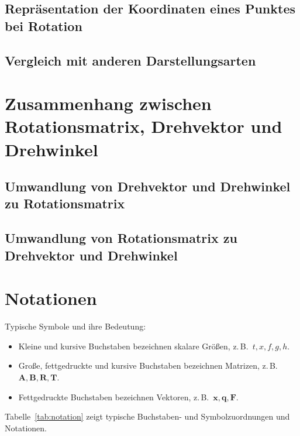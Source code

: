 \documentclass[a4paper, 11pt, accentcolor = tud3b]{tudreport}
\newcommand{\mat}[1]{\boldsymbol{#1}}
\renewcommand{\vec}[1]{\boldsymbol{\mathbf{#1}}}
\newcommand{\zB}{z.\,B.~}
\begin{document}
		\section{Repräsentation der Koordinaten eines Punktes bei Rotation} %

		\section{Vergleich mit anderen Darstellungsarten} %

	\chapter{Zusammenhang zwischen Rotationsmatrix, Drehvektor und Drehwinkel} %

		\section{Umwandlung von Drehvektor und Drehwinkel zu Rotationsmatrix} %

		\section{Umwandlung von Rotationsmatrix zu Drehvektor und Drehwinkel} %

	\chapter{Notationen}
		Typische Symbole und ihre Bedeutung:
		\begin{itemize}
			\item Kleine und kursive Buchstaben bezeichnen skalare Größen, \zB \( t, x, f, g, h \).
			\item Große, fettgedruckte und kursive Buchstaben bezeichnen Matrizen, \zB \( \mat{A}, \mat{B}, \mat{R}, \mat{T} \).
			\item Fettgedruckte Buchstaben bezeichnen Vektoren, \zB \( \vec{x}, \vec{q}, \vec{F} \).
		\end{itemize}
		Tabelle~\ref{tab:notation} zeigt typische Buchstaben- und Symbolzuordnungen und Notationen.
	
\end{document}
